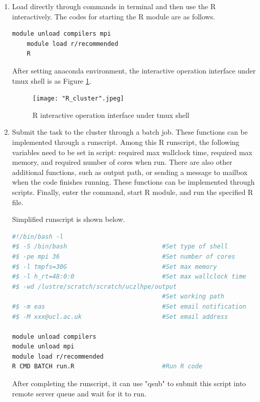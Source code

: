 \documentclass[a4paper,12pt,titlepage]{article} %
\numberwithin{equation}{section}  %
\begin{document}
	\begin{enumerate}

	\item Load directly through commands in terminal and then use the R interactively. The codes for starting the R module are as follows.
	
	
	\begin{lstlisting}[language=sh]
	module unload compilers mpi
	module load r/recommended
	R
	\end{lstlisting}
	
	After setting anaconda environment, the interactive operation interface under tmux shell is as Figure \ref{fig:R_cluster}.
	
	\begin{figure}[h]    %
	\centering           %
	\texttt{[image: "R\_cluster".jpeg]} %
	\vspace*{-0.25cm}    %
	\caption{R interactive operation interface under tmux shell}          %
	\label{fig:R_cluster}               %
	\end{figure}                        %
	
	
	\item Submit the task to the cluster through a batch job. These functions can be implemented through a runscript. Among this R runscript, the following variables need to be set in script:  required max wallclock time, required max memory, and required number of cores when run. There are also other additional functions, such as output path, or sending a message to mailbox when the code finishes running. These functions can be implemented through scripts. Finally, enter the command, start R module, and run the specified R file.
	
	Simplified runscript is shown below.
	
	\begin{lstlisting}[language=sh]
#!/bin/bash -l
#$ -S /bin/bash                          #Set type of shell
#$ -pe mpi 36                            #Set number of cores
#$ -l tmpfs=30G                          #Set max memory
#$ -l h_rt=48:0:0                        #Set max wallclock time
#$ -wd /lustre/scratch/scratch/uczlhpe/output
                                         #Set working path
#$ -m eas                                #Set email notification
#$ -M xxx@ucl.ac.uk                      #Set email address

module unload compilers
module unload mpi
module load r/recommended
R CMD BATCH run.R                        #Run R code
	\end{lstlisting}
	
After completing the runscript, it can use "qsub" to submit this script into remote server queue and wait for it to run.
	
	\end{enumerate}
	
\end{document}
